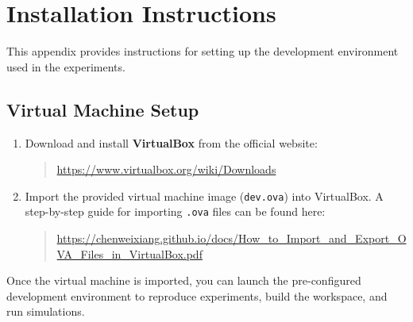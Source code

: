 \chapter{Installation Instructions}
\label{appendix:installation}

This appendix provides instructions for setting up the development environment used in the experiments.

\section{Virtual Machine Setup}

\begin{enumerate}
    \item Download and install \textbf{VirtualBox} from the official website:

    \begin{quote}
        \url{https://www.virtualbox.org/wiki/Downloads}
    \end{quote}

    \item Import the provided virtual machine image (\texttt{dev.ova}) into VirtualBox. A step-by-step guide 
    for importing \texttt{.ova} files can be found here:
    \begin{quote}
        \url{https://chenweixiang.github.io/docs/How_to_Import_and_Export_OVA_Files_in_VirtualBox.pdf}
    \end{quote}
\end{enumerate}

\noindent Once the virtual machine is imported, you can launch the pre-configured development environment to 
reproduce experiments, build the workspace, and run simulations.

